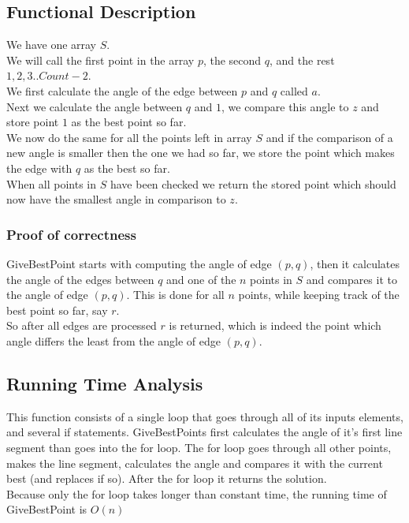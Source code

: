     \subsection{Functional Description}
    \label{sub:functional_description}
      We have one array $S$.\\
      We will call the first point in the array $p$, the second $q$, and the rest $1,2,3..Count-2$.\\
      We first calculate the angle of the edge between $p$ and $q$ called $a$.\\
      Next we calculate the angle between $q$ and $1$, we compare this angle to $z$ and store point $1$ as the best point so far.\\
      We now do the same for all the points left in array $S$ and if the comparison of a new angle is smaller then the one we had so far, we store the point which makes the edge with $q$ as the best so far.\\
      When all points in $S$ have been checked we return the stored point which should now have the smallest angle in comparison to $z$.


    \subsubsection{Proof of correctness}
    \label{ssub:proof}
      GiveBestPoint starts with computing the angle of edge $(p,q)$, then it calculates the angle of the edges between $q$ and one of the $n$ points in $S$ and compares it to the angle of edge $(p,q)$. This is done for all $n$ points, while keeping track of the best point so far, say $r$.\\
      So after all edges are processed $r$ is returned, which is indeed the point which angle differs the least from the angle of edge $(p,q)$.

    \subsection{Running Time Analysis}
    \label{sub:running_time_analysis}
      This function consists of a single loop that goes through all of its inputs elements, and several if statements. GiveBestPoints first calculates the angle of it's first line segment than goes into the for loop. The for loop goes through all other points, makes the line segment, calculates the angle and compares it with the current best (and replaces if so). After the for loop it returns the solution. \\
      Because only the for loop takes longer than constant time, the running time of GiveBestPoint is $O(n)$

